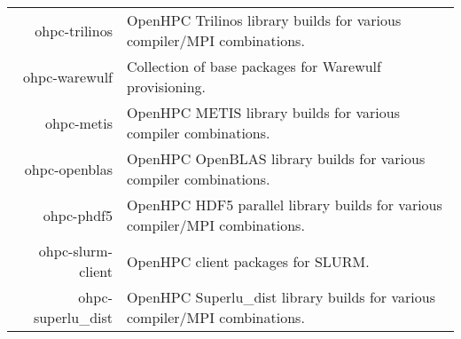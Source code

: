 \begin{tabularx}{\textwidth}{r|X}
ohpc-trilinos & OpenHPC Trilinos library builds for various compiler/MPI combinations. \\ 
ohpc-warewulf & Collection of base packages for Warewulf provisioning. \\ 
ohpc-metis & OpenHPC METIS library builds for various compiler combinations. \\ 
ohpc-openblas & OpenHPC OpenBLAS library builds for various compiler combinations. \\ 
ohpc-phdf5 & OpenHPC HDF5 parallel library builds for various compiler/MPI combinations. \\ 
ohpc-slurm-client & OpenHPC client packages for SLURM. \\ 
ohpc-superlu\_dist & OpenHPC Superlu\_dist library builds for various compiler/MPI combinations. \\ 
\bottomrule
\end{tabularx}
